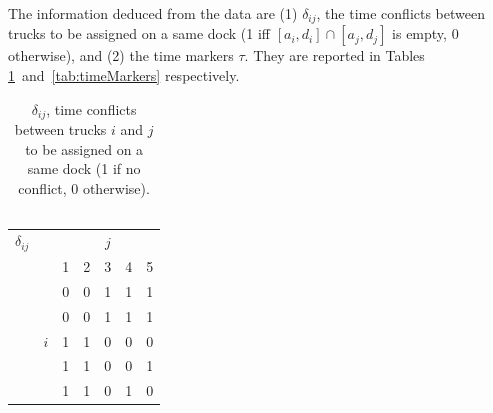 \documentclass[preprint,12pt,authoryear]{elsarticle}
\begin{document}
The information deduced from the data are (1) $\delta_{ij}$, the time conflicts between trucks to be assigned on a same dock (1 iff $[a_i,d_i] \cap [a_j,d_j]$ is empty, 0 otherwise), and (2) the time markers $\tau$. They are reported in Tables \ref{tab:didacConflicts}~and~\ref{tab:timeMarkers} respectively.

    \begin{table}[h]
        \centering
            \begin{tabular}{c c|c c c c c|}

             $\delta_{ij}$       &      & \multicolumn{5}{c|}{$j$} \\
            &     & 1 & 2 & 3 & 4 & 5 \\
            \hline
            &&  0  &  0 &  1 &  1 &  1 \\
            &&  0  &  0 &  1 &  1 &  1 \\
            &$i$ &  1 &  1 &  0 &  0 &  0 \\
            &&  1  &  1 &  0 &  0 &  1 \\
            &&  1  &  1 &  0 &  1 &  0 \\
            \end{tabular}
            \caption{$\delta_{ij}$,  time conflicts between trucks  $i$ and $j$ to be assigned on a same dock (1 if no conflict, 0 otherwise).\\$\mbox{ }$ }
            \label{tab:didacConflicts}
    \end{table}
\end{document}
